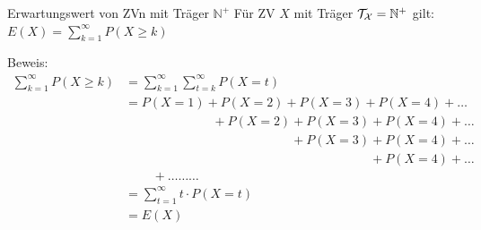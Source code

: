 \documentclass[
  10pt,
  ignorenonframetext,
]{beamer}
\begin{document}
\begin{frame}{Erwartungswert von ZVn mit Träger \(\mathbb{N}^+\)}
\label{erwartungswert-von-zvn-mit-truxe4ger-mathbbn}
Für ZV \(X\) mit Träger \(\cal{T}_X = \mathbb{N}^+\) gilt:
\(E(X) = \sum_{k=1}^\infty P(X \geq k)\)

Beweis: \begin{align*}
\sum_{k=1}^\infty P(X \geq k) &= \sum_{k=1}^\infty \sum_{t = k}^\infty P(X = t)\\
                              &= P(X = 1) + P(X = 2) + P (X = 3) + P(X = 4) + \ldots \\
                              &\phantom{=}\phantom{P(X = 1)\;\;}+ P(X = 2) + P(X = 3) + P(X = 4) + \ldots \\ 
                              &\phantom{=}\phantom{P(X = 1) + P(X = 2)\;\;}+ P(X = 3) + P(X = 4) + \ldots \\
                              &\phantom{=}\phantom{P(X = 1) + P(X = 2) + P(X = 3)\;\;} + P(X = 4) + \ldots\\
                              &\phantom{=}\;\;\; + \ldots \ldots \ldots \\
                              & = \sum_{t=1}^\infty t \cdot P(X = t) \\
                              & = E(X)
\end{align*}

\end{frame}
\end{document}
